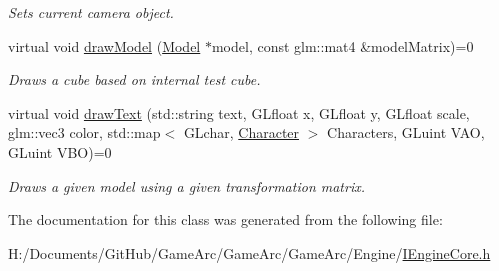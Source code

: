 \begin{DoxyCompactItemize}
\begin{DoxyCompactList}\small\item\em Sets current camera object. \end{DoxyCompactList}\item 
\hypertarget{class_i_engine_core_a45f78f207ced5253b7323f4dcb637c2d}{virtual void \hyperlink{class_i_engine_core_a45f78f207ced5253b7323f4dcb637c2d}{draw\+Model} (\hyperlink{class_model}{Model} $\ast$model, const glm\+::mat4 \&model\+Matrix)=0}\label{class_i_engine_core_a45f78f207ced5253b7323f4dcb637c2d}

\begin{DoxyCompactList}\small\item\em Draws a cube based on internal test cube. \end{DoxyCompactList}\item 
\hypertarget{class_i_engine_core_a4bd798d03cad0bdace8f0d08385c7236}{virtual void \hyperlink{class_i_engine_core_a4bd798d03cad0bdace8f0d08385c7236}{draw\+Text} (std\+::string text, G\+Lfloat x, G\+Lfloat y, G\+Lfloat scale, glm\+::vec3 color, std\+::map$<$ G\+Lchar, \hyperlink{struct_character}{Character} $>$ Characters, G\+Luint V\+A\+O, G\+Luint V\+B\+O)=0}\label{class_i_engine_core_a4bd798d03cad0bdace8f0d08385c7236}

\begin{DoxyCompactList}\small\item\em Draws a given model using a given transformation matrix. \end{DoxyCompactList}\end{DoxyCompactItemize}


The documentation for this class was generated from the following file\+:\begin{DoxyCompactItemize}
\item 
H\+:/\+Documents/\+Git\+Hub/\+Game\+Arc/\+Game\+Arc/\+Game\+Arc/\+Engine/\hyperlink{_i_engine_core_8h}{I\+Engine\+Core.\+h}\end{DoxyCompactItemize}
